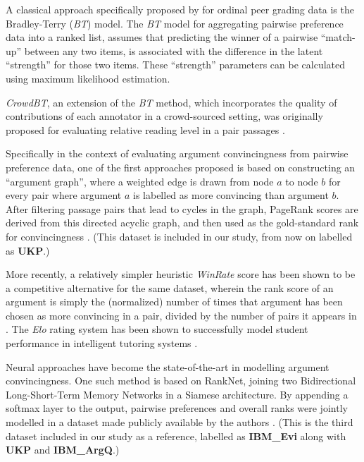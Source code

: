 \documentclass[notitlepage,12pt]{jedm}
\begin{document}
A classical approach specifically proposed by  for 
ordinal peer grading data is the Bradley-Terry (\textit{BT}) model.
The \textit{BT} model \cite{bradley_rank_1952} for aggregating pairwise 
preference data into a ranked list, assumes that predicting the winner of a 
pairwise ``match-up'' between any two items, is associated with the difference 
in the latent ``strength'' for those two items. 
These ``strength'' parameters can be calculated using maximum likelihood 
estimation.

\textit{CrowdBT}, an extension of the \textit{BT} method, which incorporates 
the quality of contributions of each annotator in a crowd-sourced setting, was
originally proposed for evaluating relative reading level in a pair passages 
\cite{chen_pairwise_2013}. 

Specifically in the context of evaluating argument convincingness from pairwise 
preference data, one of the first approaches proposed is based on constructing 
an ``argument graph'', where a weighted edge is drawn from node $a$ to node $b$ 
for every pair where argument $a$ is labelled as more convincing than argument 
$b$. 
After filtering passage pairs that lead to cycles in the graph, PageRank scores 
are derived from this directed acyclic graph, and then used as the 
gold-standard rank for convincingness \cite{habernal_which_2016}.
(This dataset is included in our study, from now on labelled as \textbf{UKP}.)

More recently, a relatively simpler heuristic \textit{WinRate} score has been 
shown to be a competitive alternative for the same dataset, wherein the rank 
score of an argument is simply the (normalized) number of times that argument 
has been chosen as more convincing in a pair, divided by the number of pairs it 
appears in .
The \textit{Elo} rating system has been shown to successfully model student 
performance in intelligent tutoring systems \cite{pelanek_applications_2016}. 

Neural approaches have become the state-of-the-art in modelling argument 
convincingness.
One such method is based on RankNet, joining two Bidirectional Long-Short-Term 
Memory Networks in a Siamese architecture. 
By appending a softmax layer to the output, pairwise preferences and overall 
ranks were jointly modelled in a dataset made publicly available by the authors 
\cite{gleize_are_2019}.
(This is the third dataset included in our study as a reference, labelled as 
\textbf{IBM\_Evi} along with \textbf{UKP} and \textbf{IBM\_ArgQ}.)
\end{document}
